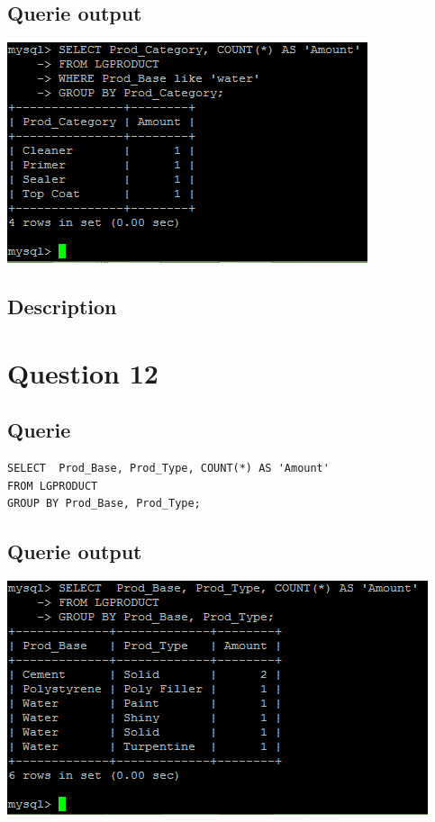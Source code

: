 \documentclass[a4paper,10pt]{article}
\begin{document}
\subsection{Querie output}
           \includegraphics{Queries/Question_11/Question_11_screenshot.PNG}
\subsection{Description}\section*{Question 12}
 \subsection{Querie}
          \lstset{
            language=SQL,
            breaklines=true
            }
        \begin{lstlisting}[frame=single]
        SELECT  Prod_Base, Prod_Type, COUNT(*) AS 'Amount'
FROM LGPRODUCT
GROUP BY Prod_Base, Prod_Type;

        \end{lstlisting}
\subsection{Querie output}
           \includegraphics{Queries/Question_12/Question_12_Screenshot.PNG}
\end{document}
